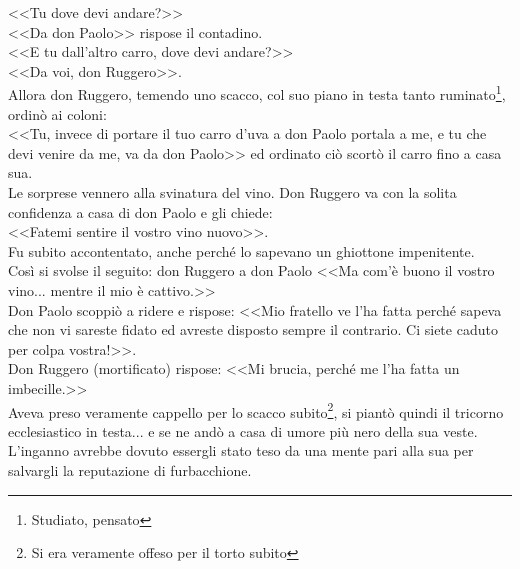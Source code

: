 \indent <<Tu dove devi andare?>>\\
\indent <<Da don Paolo>> rispose il contadino. \\
\indent <<E tu dall'altro carro, dove devi andare?>> \\
\indent <<Da voi, don Ruggero>>. \\
\indent Allora don Ruggero, temendo uno scacco, col suo piano in testa tanto ruminato\footnote{Studiato, pensato}, ordinò ai coloni: \\
\indent <<Tu, invece di portare il tuo carro d'uva a don Paolo portala a me, e tu che devi venire da me, va da don Paolo>> ed ordinato ciò scortò il carro fino a casa sua.\\
\indent Le sorprese vennero alla svinatura del vino. Don Ruggero va con la solita confidenza a casa di don Paolo e gli chiede: \\
\indent <<Fatemi sentire il vostro vino nuovo>>. \\
\indent Fu subito accontentato, anche perché lo sapevano un ghiottone impenitente.\\
\indent Così si svolse il seguito: don Ruggero a don Paolo <<Ma com'è buono il vostro vino... mentre il mio è cattivo.>> \\
\indent Don Paolo scoppiò a ridere e rispose: <<Mio fratello ve l'ha fatta perché sapeva che non vi sareste fidato ed avreste disposto sempre il contrario. Ci siete caduto per colpa vostra!>>.\\
\indent Don Ruggero (mortificato) rispose: <<Mi brucia, perché me l'ha fatta un imbecille.>>\\
\indent Aveva preso veramente cappello per lo scacco subito\footnote{Si era veramente offeso per il torto subito}, si piantò quindi il tricorno ecclesiastico in testa... e se ne andò a casa di umore più nero della sua veste.\\
\indent L'inganno avrebbe dovuto essergli stato teso da una mente pari alla sua per salvargli la reputazione di furbacchione.\\




















































%
